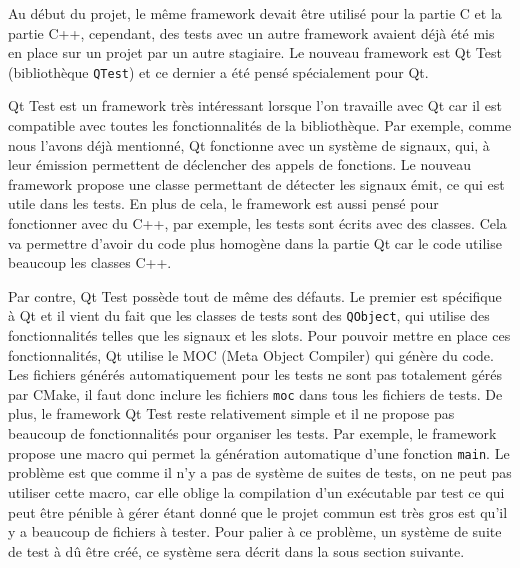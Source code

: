 \documentclass[a4paper]{article}
\begin{document}
Au début du projet, le même framework devait être utilisé pour la partie C et la
partie C++, cependant, des tests avec un autre framework avaient déjà été mis en
place sur un projet par un autre stagiaire. Le nouveau framework est Qt Test
(bibliothèque \verb|QTest|) et ce dernier a été pensé spécialement pour Qt.

Qt Test est un framework très intéressant lorsque l'on travaille avec Qt car il
est compatible avec toutes les fonctionnalités de la bibliothèque. Par exemple,
comme nous l'avons déjà mentionné, Qt fonctionne avec un système de signaux,
qui, à leur émission permettent de déclencher des appels de fonctions. Le
nouveau framework propose une classe permettant de détecter les signaux émit, ce
qui est utile dans les tests. En plus de cela, le framework est aussi pensé
pour fonctionner avec du C++, par exemple, les tests sont écrits avec des
classes. Cela va permettre d'avoir du code plus homogène dans la partie Qt car
le code utilise beaucoup les classes C++.

Par contre, Qt Test possède tout de même des défauts. Le premier est spécifique
à Qt et il vient du fait que les classes de tests sont des \verb|QObject|, qui
utilise des fonctionnalités telles que les signaux et les \gls{slots}. Pour
pouvoir mettre en place ces fonctionnalités, Qt utilise le MOC (Meta Object
Compiler) qui génère du code. Les fichiers générés automatiquement pour les
tests ne sont pas totalement gérés par CMake, il faut donc inclure les fichiers
\verb|moc| dans tous les fichiers de tests. De plus, le framework Qt Test reste
relativement simple et il ne propose pas beaucoup de fonctionnalités pour
organiser les tests. Par exemple, le framework propose une macro qui permet la
génération automatique d'une fonction \verb|main|. Le problème est que comme il
n'y a pas de système de suites de tests, on ne peut pas utiliser cette macro,
car elle oblige la compilation d'un exécutable par test ce qui peut être pénible
à gérer étant donné que le projet commun est très gros est qu'il y a beaucoup de
fichiers à tester. Pour palier à ce problème, un système de suite de test à dû
être créé, ce système sera décrit dans la sous section suivante.
\end{document}
